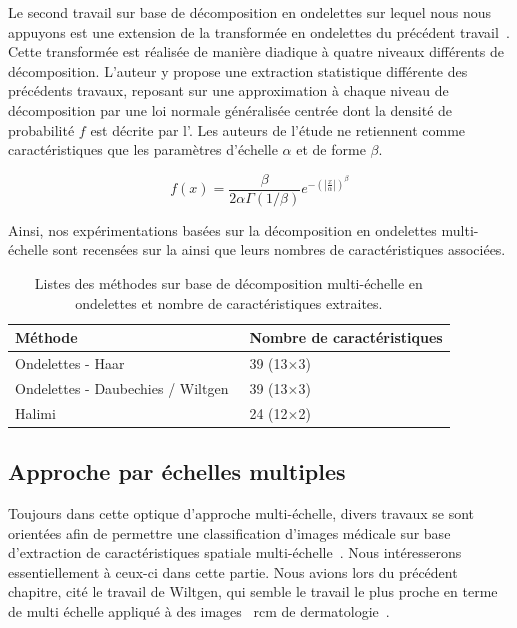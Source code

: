 Le second travail sur base de décomposition en ondelettes sur lequel nous nous appuyons est une extension de la transformée en ondelettes du précédent travail~\cite{Halimi2017a}. Cette transformée est réalisée de manière diadique à quatre niveaux différents de décomposition. L'auteur y propose une extraction statistique différente des précédents travaux, reposant sur une approximation à chaque niveau de décomposition par une loi normale généralisée centrée dont la densité de probabilité $f$ est décrite par l'. Les auteurs de l'étude ne retiennent comme caractéristiques que les paramètres d'échelle $\alpha$ et de forme $\beta$.\par

\begin{equation}
    f(x)= \frac{\beta}{2\alpha\Gamma(1/\beta)} e^{-\left(|\frac{x}{\alpha}|\right)^\beta}
    \label{eq:ggd}
\end{equation}

Ainsi, nos expérimentations basées sur la décomposition en ondelettes multi-échelle sont recensées sur la  ainsi que leurs nombres de caractéristiques associées.\par

\begin{table}[h]
    \centering
    \begin{tabular}{ll}
        \toprule
        \textbf{Méthode}                                    & \textbf{Nombre de caractéristiques}   \\ \hline
        Ondelettes - Haar                                   & 39 (13$\times$3)   \\ \hline
        Ondelettes - Daubechies / Wiltgen~\cite{Wiltgen2008}& 39 (13$\times$3)   \\ \hline
        Halimi~\cite{Halimi2017a}                           & 24 (12$\times$2)   \\
        \bottomrule
    \end{tabular}
    \caption{Listes des méthodes sur base de décomposition multi-échelle en ondelettes et nombre de caractéristiques extraites.}
    \label{tab:wavelet_multiscale_nb_features}
\end{table}\par

\subsection{Approche par échelles multiples}
Toujours dans cette optique d'approche multi-échelle, divers travaux se sont orientées afin de permettre une classification d'images médicale sur base d'extraction de caractéristiques spatiale multi-échelle~\cite{Alsaih2016,Tzalavra2016}. 
Nous intéresserons essentiellement à ceux-ci dans cette partie. Nous avions lors du précédent chapitre, cité le travail de Wiltgen, qui semble le travail le plus proche en terme de multi échelle appliqué à des images ~\gls{rcm} de dermatologie~\cite{Wiltgen2008}.\par

